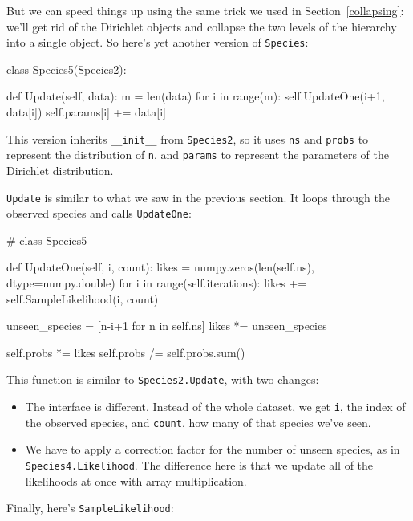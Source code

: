 \documentclass[12pt]{book}
\theoremstyle{exercise}
\newcommand{\py}[1]{{\tt #1}}%
\begin{document}
But we can speed things up using the same trick we used in
Section~\ref{collapsing}: we'll get rid of the Dirichlet objects and
collapse the two levels of the hierarchy into a single object.  So
here's yet another version of \py{Species}:

\begin{code}
class Species5(Species2):

    def Update(self, data):
        m = len(data)
        for i in range(m):
            self.UpdateOne(i+1, data[i])
            self.params[i] += data[i]
\end{code}

This version inherits \verb"__init__" from \py{Species2}, so
it uses \py{ns} and \py{probs} to represent the distribution
of \py{n}, and \py{params} to represent the parameters of
the Dirichlet distribution.

\py{Update} is similar to what we saw in the previous section.
It loops through the observed species and calls \py{UpdateOne}:

\begin{code}
# class Species5

    def UpdateOne(self, i, count):
        likes = numpy.zeros(len(self.ns), dtype=numpy.double)
        for i in range(self.iterations):
            likes += self.SampleLikelihood(i, count)

        unseen_species = [n-i+1 for n in self.ns]
        likes *= unseen_species

        self.probs *= likes
        self.probs /= self.probs.sum()
\end{code}

This function is similar to \py{Species2.Update}, with two changes:

\begin{itemize}

\item The interface is different.  Instead of the whole dataset, we
  get \py{i}, the index of the observed species, and \py{count},
  how many of that species we've seen.

\item We have to apply a correction factor for the number of unseen
  species, as in \py{Species4.Likelihood}.  The difference here is
  that we update all of the likelihoods at once with array
  multiplication.

\end{itemize}

Finally, here's \py{SampleLikelihood}:
\end{document}
